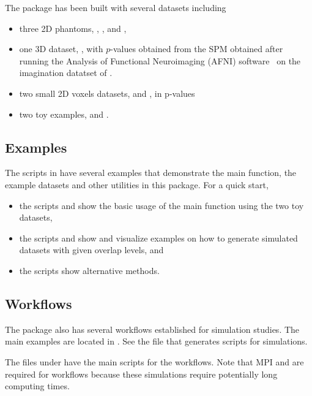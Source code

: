 The package has been built with several datasets including
\begin{itemize}
\item
three 2D phantoms, , , and ,
\item
one 3D dataset, , with $p$-values obtained from the SPM
obtained after running the Analysis of Functional Neuroimaging (AFNI)
software~\citep{cox96,coxandhyde97,cox12} on the imagination datatset of \citet{tabelowandpolzehl2011}. 
\item 
two small 2D voxels datasets,  and ,
in p-values
\item
two toy examples,  and .
\end{itemize}


\subsection[Examples]{Examples}
The scripts in  have several examples that demonstrate
the main function, the example datasets and other utilities in this package.
For a quick start,
\begin{itemize}
\item
the scripts  and 
show the basic usage of the main function  using the
two toy datasets,
\item
the scripts  and
 show and visualize
examples on how to generate simulated datasets with given overlap levels, and
\item
the scripts  show alternative methods.
\end{itemize}


\subsection[Workflows]{Workflows}
\label{sec:workflows}
The package also has several workflows established for simulation studies.
The main examples are located in .
See the file  that generates scripts for simulations.

The files under  have the main
scripts for the workflows.
Note that MPI and  are required for workflows because these
simulations require potentially long computing times.


